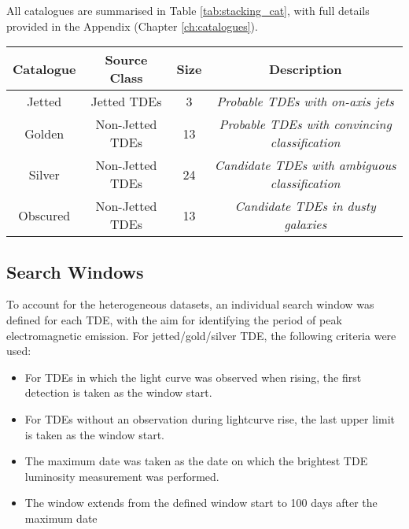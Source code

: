 All catalogues are summarised in Table \ref{tab:stacking_cat}, with full details provided in the Appendix (Chapter \ref{ch:catalogues}).

\begin{table*}[]
	\centering
	\begin{tabular}{||c c c c |} 
		\hline
		Catalogue & Source Class & Size & Description \\ [0.5ex] 
		\hline\hline
		Jetted & Jetted TDEs &  3 & \textit{Probable TDEs with on-axis jets}\\ 
		\hline
		Golden & Non-Jetted TDEs & 13 & \textit{Probable TDEs with convincing classification}\\
		\hline
		Silver & Non-Jetted TDEs & 24 & \textit{Candidate TDEs with ambiguous classification}\\
		\hline
		Obscured & Non-Jetted TDEs & 13 & \textit{Candidate TDEs in dusty galaxies}\\[1ex] 
		\hline
	\end{tabular}
	\caption{Summary of the four TDE catalogues..}
	\label{tab:stacking_cat}
\end{table*}{}

\subsection*{Search Windows}

To account for the heterogeneous datasets, an individual search window was defined for each TDE, with the aim for identifying the period of peak electromagnetic emission. For jetted/gold/silver TDE, the following criteria were used:

\begin{itemize}
	\item For TDEs in which the light curve was observed when rising, the first detection is taken as the window start.
	
	\item For TDEs without an observation during lightcurve rise, the last upper limit is taken as the window start.
	
	\item The maximum date was taken as the date on which the brightest TDE luminosity measurement was performed.
	
	\item The window extends from the defined window start to 100 days after the maximum date
	
\end{itemize}

